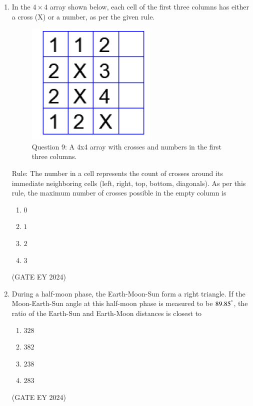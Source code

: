 \documentclass[journal]{IEEEtran}
\begin{document}
\begin{enumerate}
\item In the $4 \times 4$ array shown below, each cell of the first three columns has either a cross (X) or a number, as per the given rule.
\begin{figure}[!ht]
    \centering
    \includegraphics[width=0.4\columnwidth]{figs/Q-9.png}
    \caption{Question 9: A 4x4 array with crosses and numbers in the first three columns.}
    \label{Q.9}
\end{figure}
Rule: The number in a cell represents the count of crosses around its immediate neighboring cells (left, right, top, bottom, diagonals). As per this rule, the maximum number of crosses possible in the empty column is
    \begin{multicols}{2}
    \begin{enumerate}
        \item $0$
        \item $1$
        \item $2$
        \item $3$
    \end{enumerate}
    \end{multicols}
\hfill{(GATE EY 2024)}

\item During a half-moon phase, the Earth-Moon-Sun form a right triangle. If the Moon-Earth-Sun angle at this half-moon phase is measured to be $89.85^{\degree}$, the ratio of the Earth-Sun and Earth-Moon distances is closest to
    \begin{multicols}{2}
    \begin{enumerate}
        \item $328$
        \item $382$
        \item $238$
        \item $283$
    \end{enumerate}
    \end{multicols}
\hfill{(GATE EY 2024)}
\end{enumerate}
\bigskip
{}
\clearpage
\end{document}
